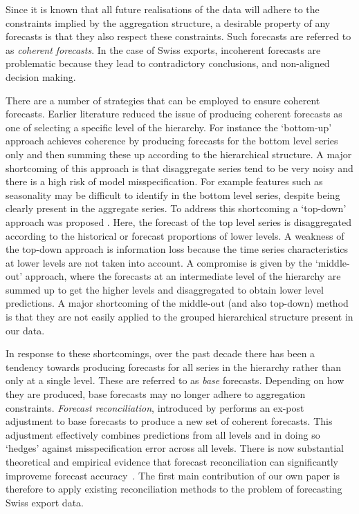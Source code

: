 \documentclass[a4paper,fleqn,11pt]{article}
\begin{document}
Since it is known that all future realisations of the data will adhere to the constraints implied by the aggregation structure, a desirable property of any forecasts is that they also respect these constraints.  Such forecasts are referred to as {\em coherent forecasts}.  In the case of Swiss exports, incoherent forecasts are problematic because they lead to contradictory conclusions, and non-aligned decision making.  

There are a number of strategies that can be employed to ensure coherent forecasts.  Earlier literature reduced the issue of producing coherent forecasts as one of selecting a specific level of the hierarchy. For instance the `bottom-up' approach \citep{Gross1990} achieves coherence by producing forecasts for the bottom level series only and then summing these up according to the hierarchical structure.  A major shortcoming of this approach is that disaggregate series tend to be very noisy and there is a high risk of model misspecification.  For example features such as seasonality may be difficult to identify in the bottom level series, despite being clearly present in the aggregate series.  To address this shortcoming a `top-down' approach was proposed \citep[see][and references therein]{Athanasopoulos2009}.  Here, the forecast of the top level series is disaggregated according to the historical or forecast proportions of lower levels. A weakness of the top-down approach is information loss because the time series characteristics at lower levels are not taken into account. A compromise is given by the `middle-out' approach, where the forecasts at an intermediate level of the hierarchy are summed up to get the higher levels and disaggregated to obtain lower level predictions.  A major shortcoming of the middle-out (and also top-down) method is that they are not easily applied to the grouped hierarchical structure present in our data.

In response to these shortcomings, over the past decade there has been a tendency towards producing forecasts for all series in the hierarchy rather than only at a single level.  These are referred to as {\em base} forecasts.  Depending on how they are produced, base forecasts may no longer adhere to aggregation constraints.  {\em Forecast reconciliation}, introduced by \cite{Hyndman2011} performs an ex-post adjustment to base forecasts to produce a new set of coherent forecasts. This adjustment effectively combines predictions from all levels and in doing so `hedges' against misspecification error across all levels.  There is now substantial theoretical and empirical evidence that forecast reconciliation can significantly improveme forecast accuracy~\citep[see][and references therein]{Wickramasuriya2015}. The first main contribution of our own paper is therefore to apply existing reconciliation methods to the problem of forecasting Swiss export data.
\end{document}
